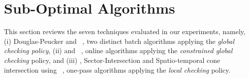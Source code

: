 \newtheorem{theorem}{Theorem}
\newtheorem{lemma}{Lemma}

\vspace{-1ex}
\section{Sub-Optimal Algorithms}
\label{sec-subopt}



This section reviews the seven techniques evaluated in our experiments, namely,
(i) Douglas-Peucker\cite{Douglas:Peucker} and \pavlidis~\cite{Pavlidis:Segment}, two distinct batch algorithms applying the \emph{global checking policy},
(ii) \bqsa\cite{Liu:BQS} and \squishe~\cite{Muckell:SQUISH}, online algorithms applying the \emph{constrained global checking} policy, %
and (iii) \operb\cite{Lin:Operb}, Sector-Intersection\cite{Williams:Longest,Sklansky:Cone,Dunham:Cone, Zhao:Sleeve} and Spatio-temporal cone intersection using \sed~\cite{Lin:Cised}, one-pass algorithms applying the \emph{local checking} policy.










